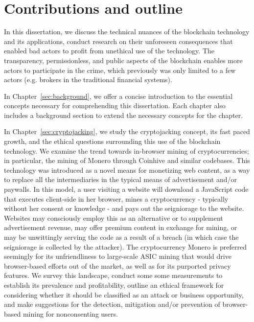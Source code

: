 \section{Contributions and outline} 
In this dissertation, we discuss the technical nuances of the blockchain technology and its applications, conduct research on their unforeseen consequences that enabled bad actors to profit from unethical use of the technology. The transparency, permissionless, and public aspects of the blockchain enables more actors to participate in the crime, which previously was only limited to a few actors (e.g. brokers in the traditional financial systems). 

In Chapter~\ref{sec:background}, we offer a concise introduction to the essential concepts necessary for comprehending this dissertation. Each chapter also includes a background section to extend the necessary concepts for the chapter.

In Chapter~\ref{sec:cryptojacking}, we study the cryptojacking concept, its fast paced growth, and the ethical questions surrounding this use of the blockchain technology. We examine the trend towards in-browser mining of cryptocurrencies; in particular, the mining of Monero through Coinhive and similar codebases. This technology was introduced as a novel means for monetizing web content, as a way to replace all the intermediaries in the typical means of advertisement and/or paywalls. In this model, a user visiting a website will download a JavaScript code that executes client-side in her browser, mines a cryptocurrency - typically without her consent or knowledge - and pays out the seigniorage to the website. Websites may consciously employ this as an alternative or to supplement advertisement revenue, may offer premium content in exchange for mining, or may be unwittingly serving the code as a result of a breach (in which case the seigniorage is collected by the attacker). The cryptocurrency Monero is preferred seemingly for its unfriendliness to large-scale ASIC mining that would drive browser-based efforts out of the market, as well as for its purported privacy features. We survey this landscape, conduct some some measurements to establish its prevalence and profitability, outline an ethical framework for considering whether it should be classified as an attack or business opportunity, and make suggestions for the detection, mitigation and/or prevention of browser-based mining for nonconsenting users.


